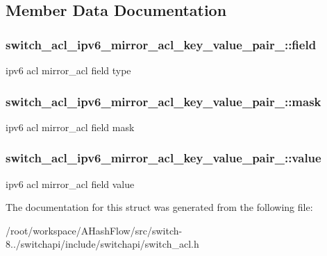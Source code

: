 \subsection{Member Data Documentation}
\hypertarget{structswitch__acl__ipv6__mirror__acl__key__value__pair___a75ddd30627b37b6a72b21e92d73e4f32}{
\subsubsection[{field}]{ switch\+\_\+acl\+\_\+ipv6\+\_\+mirror\+\_\+acl\+\_\+key\+\_\+value\+\_\+pair\+\_\+\+::field}}\label{structswitch__acl__ipv6__mirror__acl__key__value__pair___a75ddd30627b37b6a72b21e92d73e4f32}
ipv6 acl mirror\+\_\+acl field type \hypertarget{structswitch__acl__ipv6__mirror__acl__key__value__pair___a7492204a7834b7b7da1868ef003e0346}{
\subsubsection[{mask}]{ switch\+\_\+acl\+\_\+ipv6\+\_\+mirror\+\_\+acl\+\_\+key\+\_\+value\+\_\+pair\+\_\+\+::mask}}\label{structswitch__acl__ipv6__mirror__acl__key__value__pair___a7492204a7834b7b7da1868ef003e0346}
ipv6 acl mirror\+\_\+acl field mask \hypertarget{structswitch__acl__ipv6__mirror__acl__key__value__pair___a9a63c119ffe07f6ffd5bf5a076230606}{
\subsubsection[{value}]{ switch\+\_\+acl\+\_\+ipv6\+\_\+mirror\+\_\+acl\+\_\+key\+\_\+value\+\_\+pair\+\_\+\+::value}}\label{structswitch__acl__ipv6__mirror__acl__key__value__pair___a9a63c119ffe07f6ffd5bf5a076230606}
ipv6 acl mirror\+\_\+acl field value 

The documentation for this struct was generated from the following file\+:\begin{DoxyCompactItemize}
\item 
/root/workspace/\+A\+Hash\+Flow/src/switch-\/8../switchapi/include/switchapi/switch\+\_\+acl.\+h\end{DoxyCompactItemize}
